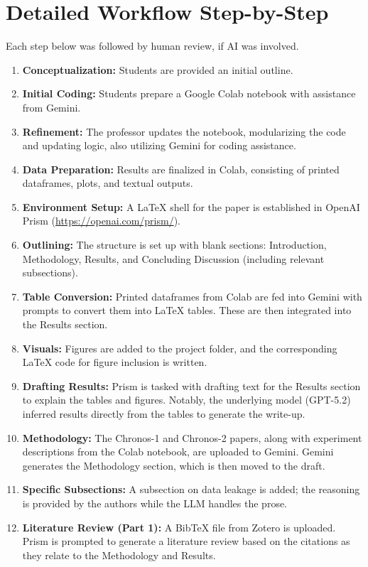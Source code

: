 \documentclass[twocolumn]{article}
\begin{document}
\section*{Detailed Workflow Step-by-Step}

Each step below was followed by human review, if AI was involved. 

\begin{enumerate}[label=\arabic*.]
    \item \textbf{Conceptualization:} Students are provided an initial outline.
    \item \textbf{Initial Coding:} Students prepare a Google Colab notebook with assistance from Gemini.
    \item \textbf{Refinement:} The professor updates the notebook, modularizing the code and updating logic, also utilizing Gemini for coding assistance.
    \item \textbf{Data Preparation:} Results are finalized in Colab, consisting of printed dataframes, plots, and textual outputs.
    \item \textbf{Environment Setup:} A \LaTeX{} shell for the paper is established in OpenAI Prism (\url{https://openai.com/prism/}).
    \item \textbf{Outlining:} The structure is set up with blank sections: Introduction, Methodology, Results, and Concluding Discussion (including relevant subsections).
    \item \textbf{Table Conversion:} Printed dataframes from Colab are fed into Gemini with prompts to convert them into \LaTeX{} tables. These are then integrated into the Results section.
    \item \textbf{Visuals:} Figures are added to the project folder, and the corresponding \LaTeX{} code for figure inclusion is written.
    \item \textbf{Drafting Results:} Prism is tasked with drafting text for the Results section to explain the tables and figures. Notably, the underlying model (GPT-5.2) inferred results directly from the tables to generate the write-up.
    \item \textbf{Methodology:} The Chronos-1 and Chronos-2 papers, along with experiment descriptions from the Colab notebook, are uploaded to Gemini. Gemini generates the Methodology section, which is then moved to the draft.
    \item \textbf{Specific Subsections:} A subsection on data leakage is added; the reasoning is provided by the authors while the LLM handles the prose.
    \item \textbf{Literature Review (Part 1):} A Bib\TeX{} file from Zotero is uploaded. Prism is prompted to generate a literature review based on the citations as they relate to the Methodology and Results.

\end{enumerate}
\end{document}

